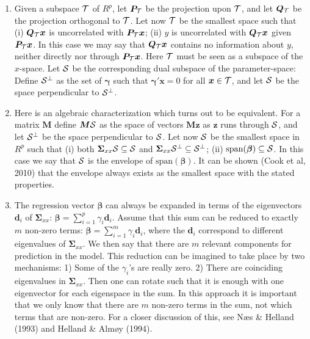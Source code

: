 \documentclass[a4paper, 11pt]{article}
\begin{document}
\begin{enumerate}[label=\Alph*.]

\item Given a subspace $\cal{T}$ of $R^p$, let $\bm{P}_{\cal{T}}$ be the projection upon $\cal{T}$, and let $\bm{Q}_{\cal{T}}$ be the projection orthogonal to $\cal{T}$. Let now $\cal{T}$ be the smallest space such that (i) $\bm{Q}_{\cal{T}}\bm{x}$ is uncorrelated with $\bm{P}_{\cal{T}}\bm{x}$; (ii) $y$ is uncorrelated with $\bm{Q}_{\cal{T}}\bm{x}$ given $\bm{P}_{\cal{T}}\bm{x}$. In this case we may say that $\bm{Q}_{\cal{T}}\bm{x}$ contains no information about $y$, neither directly nor through $\bm{P}_{\cal{T}}\bm{x}$. Here $\cal{T}$ must be seen as a subspace of the $x$-space. Let $\cal{S}$ be the corresponding dual subspace of the parameter-space: Define $\cal{S}^\perp$ as the set of $\bm{\gamma}$ such that $\bm{\gamma}'\bm{x}=0$ for all $\bm{x}\in\cal{T}$, and let $\cal{S}$ be the space perpendicular to $\cal{S}^\perp$. 
  \smallskip

\item  Here is an algebraic characterization which turns out to be equivalent. For a matrix $\bm{M}$ define $\bm{M}\cal{S}$ as the space of vectors $\bm{Mz}$ as $\bm{z}$ runs through $\cal{S}$, and let $\cal{S}^\perp$ be 
  the space perpendicular to $\cal{S}$. Let now $\cal{S}$ be the smallest space in $R^p$ such that (i) both $\bm{\Sigma}_{xx}\cal{S}\subseteq\cal{S}$ and 
  $\bm{\Sigma}_{xx}\cal{S}^\perp\subseteq\cal{S}^\perp$; (ii) $\mathrm{span}(\bm{\beta})\subseteq\cal{S}$. In this case we say that $\cal{S}$ 
  is the envelope of $\mathrm{span}(\bm{\beta})$. It can be shown (Cook et al, 2010) that the envelope always exists as the smallest space with the stated properties.
  \smallskip

\item The regression vector $\bm{\beta}$ can always be expanded in terms of the eigenvectors $\bm{d}_{i}$ of $\bm{\Sigma}_{xx}$: 
  $\bm{\beta}=\sum_{i=1}^p \gamma_{i}\bm{d}_{i}$. Assume that this sum can be reduced to exactly $m$ non-zero terms:
  $\bm{\beta}=\sum_{i=1}^m \gamma_{i}\bm{d}_{i}$, where the $\bm{d}_i$ correspond to different eigenvalues of $\bm{\Sigma}_{xx}$. We then say that there are $m$ relevant components for prediction in the model. This reduction can be imagined to take place by two mechanisms: 1) Some of the $\gamma_i$'s are really zero. 2) There are coinciding eigenvalues in $\bm{\Sigma}_{xx}$. Then one can rotate such that it is enough with one eigenvector for each eigenspace in the sum. In this approach it is important that we only know that there are $m$ non-zero terms in the sum, not which  terms that are non-zero. For a closer discussion of this, see N\ae s \& Helland (1993) and Helland \& Alm\o y (1994).
  \smallskip


\end{enumerate}
\end{document}
